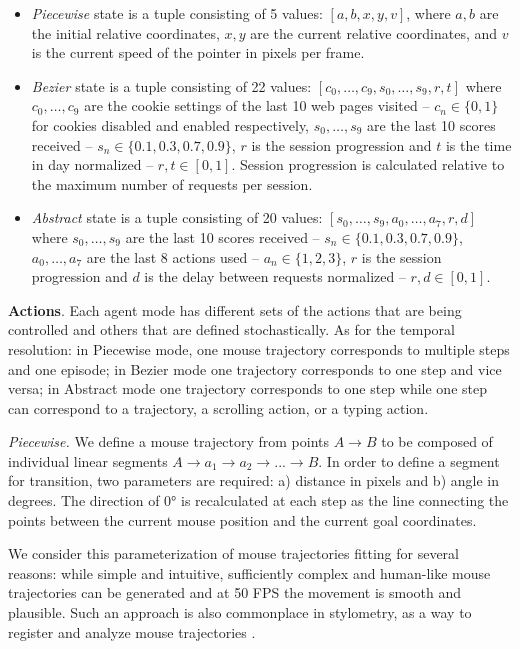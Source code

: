 \begin{itemize}
\item \emph{Piecewise} state is a tuple consisting of 5 values: $[a,b,x,y,v]$, where $a,b$ are the initial relative coordinates, $x,y$ are the current relative coordinates, and $v$ is the current speed of the pointer in pixels per frame.
\item \emph{Bezier} state is a tuple consisting of 22 values: $[c_0,\dots,c_9,s_0,\dots,s_9, r, t]$ where $c_0,\dots,c_9$ are the cookie settings of the last 10 web pages visited -- $c_n \in \{0,1\}$ for cookies disabled and enabled respectively, $s_0,\dots,s_9$ are the last 10 scores received -- $s_n \in \{0.1,0.3,0.7,0.9\}$, $r$ is the session progression and $t$ is the time in day normalized -- $r,t \in [0,1]$.
Session progression is calculated relative to the maximum number of requests per session.
\item \emph{Abstract} state is a tuple consisting of 20 values: $[s_0,\dots,s_9,a_0,\dots,a_7,r,d]$ where $s_0,\dots,s_9$ are the last 10 scores received -- $s_n \in \{0.1,0.3,0.7,0.9\}$, $a_0,\dots,a_7$ are the last 8 actions used -- $a_n \in \{1,2,3\}$, $r$ is the session progression and $d$ is the delay between requests normalized -- $r,d \in [0,1]$.
\end{itemize}

\textbf{Actions}. Each agent mode has different sets of the actions that are being controlled and others that are defined stochastically.
As for the temporal resolution: in Piecewise mode, one mouse trajectory corresponds to multiple steps and one episode; in Bezier mode one trajectory corresponds to one step and vice versa; in Abstract mode one trajectory corresponds to one step while one step can correspond to a trajectory, a scrolling action, or a typing action.

\emph{Piecewise.} We define a mouse trajectory from points $A \rightarrow B$ to be composed of individual linear segments $A \rightarrow a_1 \rightarrow a_2 \rightarrow ... \rightarrow B$.
In order to define a segment for transition, two parameters are required: a) distance in pixels and b) angle in degrees. The direction of \ang{0} is recalculated at each step as the line connecting the points between the current mouse position and the current goal coordinates.

We consider this parameterization of mouse trajectories fitting for several reasons: while simple and intuitive, sufficiently complex and human-like mouse trajectories can be generated and at 50 FPS the movement is smooth and plausible.
Such an approach is also commonplace in stylometry, as a way to register and analyze mouse trajectories \cite{fridman2015multi}.

